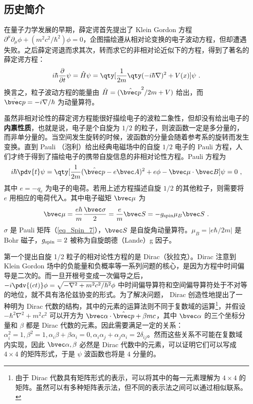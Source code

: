 
\subsection{历史简介}
在量子力学发展的早期，薛定谔首先提出了 Klein Gordon 方程 $\partial^\mu \partial_\mu \phi+(m^2c^2/\hbar^2)\phi=0$，企图描绘遵从相对论变换的电子波动方程，但却遭遇失败。之后薛定谔退而求其次，转而求它的非相对论近似下的方程，得到了著名的薛定谔方程：
\begin{equation}
i\hbar \frac{\partial }{\partial t}\psi = \hat H\psi=\qty[\frac{ 1}{2m}\qty(-i\hbar\nabla)^2+V(x)]\psi~.
\end{equation}
换言之，粒子波动方程的能量由 $\hat H=(\hat{\bvec p}^2/2m+V)$ 给出，而 $\hat{\bvec p}=-i\nabla/\hbar$ 为动量算符。

虽然非相对论性的薛定谔方程能很好描绘电子的波粒二象性，但却没有给出电子的\textbf{内禀性质}，也就是说，电子是个自旋为 $1/2$ 的粒子，则波函数一定是多分量的，而非单分量的。当空间发生旋转的时候，波函数的分量会随着参考系的旋转而发生变换。直到 Pauli （泡利）给出经典电磁场中的自旋 $1/2$ 电子的 Pauli 方程，人们才终于得到了描绘电子的携带自旋信息的非相对论性方程。Pauli 方程为
\begin{equation}
i\hbar\pdv{t} \psi=\qty[\frac{1}{2m}(\hat{\bvec p}-e\bvec A)^2+e\phi-\bvec \mu\cdot \bvec B]\psi = 0~,
\end{equation}
其中 $e=-q_e$ 为电子的电荷。若用上述方程描述自旋 $1/2$ 的其他粒子，则需要将 $e$ 用相应的电荷代入。其中电子磁矩 $\bvec \mu$ 为
\begin{equation}
\bvec \mu = \frac{e\hbar}{m}\frac{\bvec \sigma}{2}=\frac{e}{m}\bvec S=-g_{\rm spin}\mu_B \bvec S~.
\end{equation}
$\sigma$ 是 Pauli 矩阵（\autoref{eq_Spin_7}），$\bvec S$ 是自旋角动量算符。$\mu_B=|e\hbar/2m|$ 是 Bohr 磁子，$g_{\rm spin}=2$ 被称为自旋朗德（Lande）g 因子。

第一个提出自旋 1/2 粒子的相对论性方程的是 Dirac（狄拉克）。Dirac 注意到 Klein Gordon 场中的负能量和负概率等一系列问题的核心，是因为方程中时间偏导是二次的。而一旦开根号变成一次偏导之后，$-i\pdv{(ct)} \phi=\sqrt{-\nabla^2+m^2c^2/\hbar^2}\phi$ 中时间偏导算符和空间偏导算符处于不对等的地位，就不具有洛伦兹协变的形式。为了解决问题， Dirac 创造性地提出了一种明为 Dirac 代数的结构，其中的元素的运算法则不同于复数域的运算\footnote{由于 Dirac 代数具有矩阵形式的表示，可以将其中的每一元素理解为 $4\times 4$ 的矩阵。虽然可以有多种矩阵表示法，但不同的表示法之间可以通过相似联系。}，并假设 $-\hbar^2\nabla^2+m^2c^2$ 可以开方为 $\bvec \alpha \cdot \hat{\bvec p}+\beta mc$，其中 $\bvec \alpha$ 的三个坐标分量和 $\beta$ 都是 Dirac 代数的元素。因此需要满足一定的关系：$\alpha_i^2=1,\beta^2=1,\alpha_i\beta+\beta \alpha_i=0,\alpha_i\alpha_j+\alpha_j\alpha_i=2\delta_{ij}$。然而这些关系不可能在复数域内实现，因此 $\bvec \alpha,\beta$ 必然是 Dirac 代数中的元素，可以证明它们可以写成 $4\times 4$ 的矩阵形式，于是 $\psi$ 波函数也将是 $4$ 分量的。


